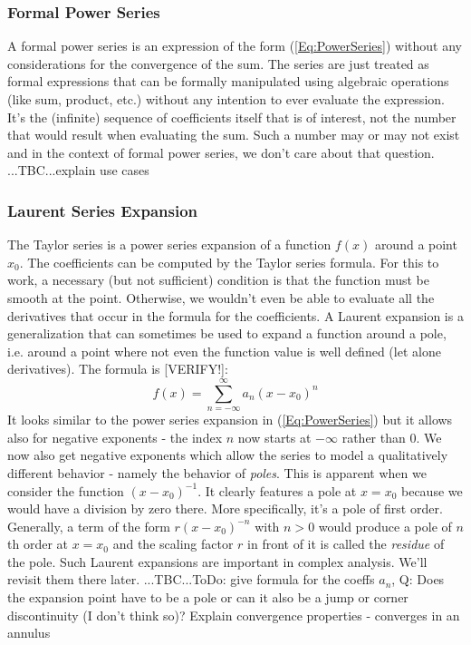 
\subsubsection{Formal Power Series}
A formal power series is an expression of the form (\ref{Eq:PowerSeries}) without any considerations for the convergence of the sum. The series are just treated as formal expressions that can be formally manipulated using algebraic operations (like sum, product, etc.) without any intention to ever evaluate the expression. It's the (infinite) sequence of coefficients itself that is of interest, not the number that would result when evaluating the sum. Such a number may or may not exist and in the context of formal power series, we don't care about that question. ...TBC...explain use cases


\subsubsection{Laurent Series Expansion}
The Taylor series is a power series expansion of a function $f(x)$ around a point $x_0$. The coefficients can be computed by the Taylor series formula. For this to work, a necessary (but not sufficient) condition is that the function must be smooth at the point. Otherwise, we wouldn't even be able to evaluate all the derivatives that occur in the formula for the coefficients. A Laurent expansion is a generalization that can sometimes be used to expand a function around a pole, i.e. around a point where not even the function value is well defined (let alone derivatives). The formula is [VERIFY!]:
\begin{equation}
\label{Eq:LaurentSeriesReal}
f(x) = \sum_{n=-\infty}^\infty a_n  (x-x_0)^n
\end{equation}
It looks similar to the power series expansion in (\ref{Eq:PowerSeries}) but it allows also for negative exponents - the index $n$ now starts at $-\infty$ rather than $0$. We now also get negative exponents which allow the series to model a qualitatively different behavior - namely the behavior of \emph{poles}. This is apparent when we consider the function $(x-x_0)^{-1}$. It clearly features a pole at $x = x_0$ because we would have a division by zero there. More specifically, it's a pole of first order. Generally, a term of the form $r (x-x_0)^{-n}$ with $n > 0$ would produce a pole of $n$th order at $x = x_0$ and the scaling factor $r$ in front of it is called the \emph{residue} of the pole. Such Laurent expansions are important in complex analysis. We'll revisit them there later. ...TBC...ToDo: give formula for the coeffs $a_n$, Q: Does the expansion point have to be a pole or can it also be a jump or corner discontinuity (I don't think so)? Explain convergence properties - converges in an annulus

